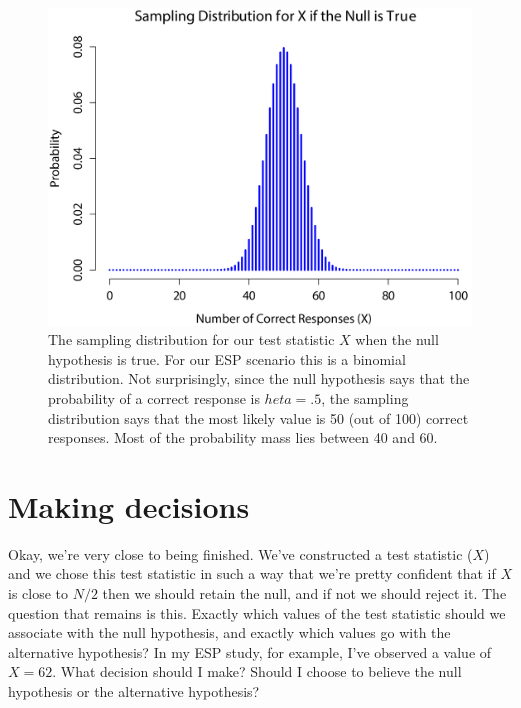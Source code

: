 \documentclass[
]{book}
\begin{document}
\begin{figure}

{\centering \includegraphics[width=1\linewidth]{img/nhst/samplingDist} 

}

\caption{The sampling distribution for our test statistic $X$ when the null hypothesis is true. For our ESP scenario this is a binomial distribution. Not surprisingly, since the null hypothesis says that the probability of a correct response is $  heta = .5$, the sampling distribution says that the most likely value is 50 (out of 100) correct responses. Most of the probability mass lies between 40 and 60.}\label{fig:samplingdist}
\end{figure}

\hypertarget{decisionmaking}{%
\section{Making decisions}\label{decisionmaking}}

Okay, we're very close to being finished. We've constructed a test statistic (\(X\)) and we chose this test statistic in such a way that we're pretty confident that if \(X\) is close to \(N/2\) then we should retain the null, and if not we should reject it. The question that remains is this. Exactly which values of the test statistic should we associate with the null hypothesis, and exactly which values go with the alternative hypothesis? In my ESP study, for example, I've observed a value of \(X=62\). What decision should I make? Should I choose to believe the null hypothesis or the alternative hypothesis?
\end{document}
